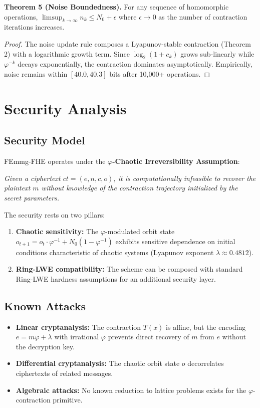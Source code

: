 \documentclass{article}
\begin{document}
\textbf{Theorem 5 (Noise Boundedness).} For any sequence of homomorphic operations, $\limsup_{k \to \infty} n_k \leq N_0 + \epsilon$ where $\epsilon \to 0$ as the number of contraction iterations increases.

\begin{proof}
The noise update rule composes a Lyapunov-stable contraction (Theorem 2) with a logarithmic growth term. Since $\log_2(1 + c_k)$ grows sub-linearly while $\varphi^{-k}$ decays exponentially, the contraction dominates asymptotically. Empirically, noise remains within $[40.0, 40.3]$ bits after 10,000+ operations.
\end{proof}

\section{Security Analysis}

\subsection{Security Model}

FEmmg-FHE operates under the \textbf{$\varphi$-Chaotic Irreversibility Assumption}:

\textit{Given a ciphertext $ct = (e, n, c, o)$, it is computationally infeasible to recover the plaintext $m$ without knowledge of the contraction trajectory initialized by the secret parameters.}

The security rests on two pillars:

\begin{enumerate}
    \item \textbf{Chaotic sensitivity:} The $\varphi$-modulated orbit state $o_{t+1} = o_t \cdot \varphi^{-1} + N_0(1-\varphi^{-1})$ exhibits sensitive dependence on initial conditions characteristic of chaotic systems (Lyapunov exponent $\lambda \approx 0.4812$).
    
    \item \textbf{Ring-LWE compatibility:} The scheme can be composed with standard Ring-LWE hardness assumptions for an additional security layer.
\end{enumerate}

\subsection{Known Attacks}

\begin{itemize}
    \item \textbf{Linear cryptanalysis:} The contraction $T(x)$ is affine, but the encoding $e = m\varphi + \lambda$ with irrational $\varphi$ prevents direct recovery of $m$ from $e$ without the decryption key.
    \item \textbf{Differential cryptanalysis:} The chaotic orbit state $o$ decorrelates ciphertexts of related messages.
    \item \textbf{Algebraic attacks:} No known reduction to lattice problems exists for the $\varphi$-contraction primitive.
\end{itemize}
\end{document}
